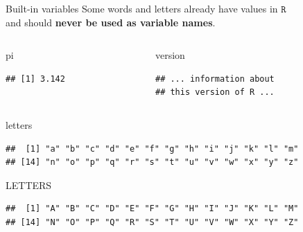 \documentclass[
  ignorenonframetext,
]{beamer}
\newenvironment{Shaded}{\begin{snugshade}}{\end{snugshade}}
\newcommand{\NormalTok}[1]{#1}
\begin{document}
\begin{frame}[fragile]{Built-in variables}
\protect\hypertarget{built-in-variables}{}
Some words and letters already have values in \(\texttt{R}\)\\
and should \textbf{never be used as variable names}.

\begin{columns}[T]
\begin{column}{0.5\textwidth}
\begin{Shaded}
\begin{Highlighting}[]
\NormalTok{pi}
\end{Highlighting}
\end{Shaded}

\begin{verbatim}
## [1] 3.142
\end{verbatim}
\end{column}

\begin{column}{0.5\textwidth}
\begin{Shaded}
\begin{Highlighting}[]
\NormalTok{version}
\end{Highlighting}
\end{Shaded}

\begin{verbatim}
## ... information about 
## this version of R ...
\end{verbatim}
\end{column}
\end{columns}

\begin{Shaded}
\begin{Highlighting}[]
\NormalTok{letters}
\end{Highlighting}
\end{Shaded}

\begin{verbatim}
##  [1] "a" "b" "c" "d" "e" "f" "g" "h" "i" "j" "k" "l" "m"
## [14] "n" "o" "p" "q" "r" "s" "t" "u" "v" "w" "x" "y" "z"
\end{verbatim}

\begin{Shaded}
\begin{Highlighting}[]
\NormalTok{LETTERS}
\end{Highlighting}
\end{Shaded}

\begin{verbatim}
##  [1] "A" "B" "C" "D" "E" "F" "G" "H" "I" "J" "K" "L" "M"
## [14] "N" "O" "P" "Q" "R" "S" "T" "U" "V" "W" "X" "Y" "Z"
\end{verbatim}
\end{frame}
\end{document}
